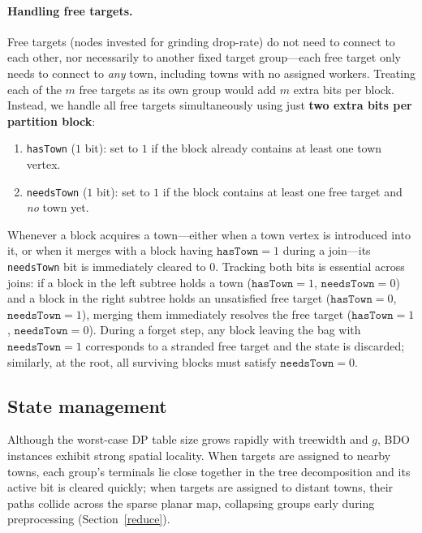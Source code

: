 \documentclass[11pt]{article}
\theoremstyle{definition}
\theoremstyle{remark}
\begin{document}
\paragraph{Handling free targets.}
Free targets (nodes invested for grinding drop-rate) do not need to connect to each other, nor necessarily to another fixed target group---each free target only needs to connect to \emph{any} town, including towns with no assigned workers. Treating each of the $m$ free targets as its own group would add $m$ extra bits per block. Instead, we handle all free targets simultaneously using just \textbf{two extra bits per partition block}:
\begin{enumerate}
    \item[$\bullet$] \texttt{hasTown} ($1$ bit): set to $1$ if the block already contains at least one town vertex.
    \item[$\bullet$] \texttt{needsTown} ($1$ bit): set to $1$ if the block contains at least one free target and \emph{no} town yet.
\end{enumerate}
Whenever a block acquires a town---either when a town vertex is introduced into it, or when it merges with a block having $\texttt{hasTown} = 1$ during a join---its \texttt{needsTown} bit is immediately cleared to $0$. Tracking both bits is essential across joins: if a block in the left subtree holds a town ($\texttt{hasTown} = 1$, $\texttt{needsTown} = 0$) and a block in the right subtree holds an unsatisfied free target ($\texttt{hasTown} = 0$, $\texttt{needsTown} = 1$), merging them immediately resolves the free target ($\texttt{hasTown} = 1$, $\texttt{needsTown} = 0$). During a forget step, any block leaving the bag with $\texttt{needsTown} = 1$ corresponds to a stranded free target and the state is discarded; similarly, at the root, all surviving blocks must satisfy $\texttt{needsTown} = 0$.


\subsection{State management}
\label{sec:state_mgmt}
Although the worst-case DP table size grows rapidly with treewidth and $g$, BDO instances exhibit strong spatial locality. When targets are assigned to nearby towns, each group's terminals lie close together in the tree decomposition and its active bit is cleared quickly; when targets are assigned to distant towns, their paths collide across the sparse planar map, collapsing groups early during preprocessing (Section~\ref{reduce}).
\end{document}
